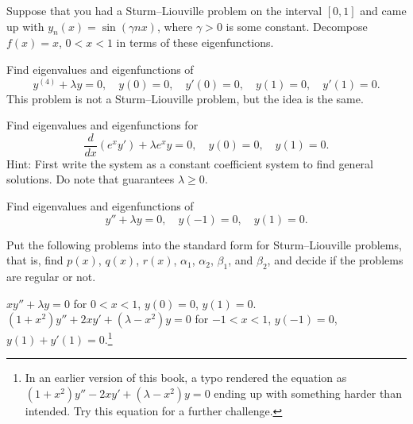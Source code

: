 \begin{exercise}
Suppose that you had a Sturm--Liouville problem on the interval
$[0,1]$ and came up with
$y_n(x) = \sin (\gamma n x)$, where $\gamma > 0$ is some constant.
Decompose $f(x) = x$, $0 < x < 1$ in terms of these eigenfunctions.
\end{exercise}

\begin{exercise}
Find eigenvalues and eigenfunctions of
\begin{equation*}
y^{(4)}+\lambda y = 0, \quad y(0) = 0, \quad y'(0) = 0, \quad y(1) = 0, \quad
y'(1) = 0 .
\end{equation*}
This problem is not a Sturm--Liouville problem, but the idea is the same.
\end{exercise}

\begin{exercise}
Find eigenvalues and eigenfunctions for
\begin{equation*}
\frac{d}{dx} (e^x y') + \lambda e^x y = 0, \quad y(0) = 0, \quad y(1) = 0 .
\end{equation*}
Hint: First write the system as a constant coefficient system to find
general solutions.  Do note that  guarantees $\lambda \geq 0$.
\end{exercise}

\setcounter{exercise}{100}

\begin{exercise}
Find eigenvalues and eigenfunctions of
\begin{equation*}
y'' + \lambda y = 0, \quad y(-1) = 0, \quad y(1) = 0 .
\end{equation*}
\end{exercise}

\begin{exercise}
Put the following problems into the standard form for Sturm--Liouville
problems, that is, find $p(x)$, $q(x)$, $r(x)$,
$\alpha_1$,
$\alpha_2$,
$\beta_1$, and
$\beta_2$,
and decide if the problems are regular or not.
\begin{tasks}
\task $x y'' + \lambda y = 0$
\enspace for $0 < x < 1$,
\enspace $y(0) = 0$,
\enspace $y(1) = 0$.
\task
$(1+x^2) y'' + 2xy' + (\lambda-x^2) y = 0$
\enspace for $-1 < x < 1$,
\enspace $y(-1) = 0$,
\enspace $y(1)+y'(1) = 0$.\footnote{%
In an earlier version of this book, a typo rendered the equation
as $(1+x^2) y'' - 2xy' + (\lambda-x^2) y = 0$ ending up with something
harder than intended.  Try this equation for a further challenge.}
\end{tasks}
\end{exercise}

